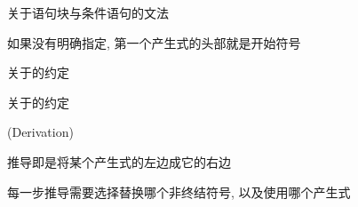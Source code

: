 % 
%   

\begin{frame}{}
  \begin{center}

    \vspace{0.20cm}
    关于语句块与条件语句的文法

    \vspace{0.50cm}
     如果没有明确指定, 第一个产生式的头部就是开始符号
  \end{center}
\end{frame}

\begin{frame}{}
  \begin{center}
    关于的约定

    \vspace{0.30cm}
  \end{center}
\end{frame}

\begin{frame}{}
  \begin{center}
    关于的约定

    \vspace{0.30cm}
  \end{center}
\end{frame}


\begin{frame}{}
  \begin{center}
    {\large {}} (Derivation)

    \vspace{0.50cm}

    \vspace{0.50cm}
    推导即是将某个产生式的左边成它的右边

    \vspace{1.00cm}
    每一步推导需要选择替换哪个非终结符号, 以及使用哪个产生式
  \end{center}
\end{frame}

